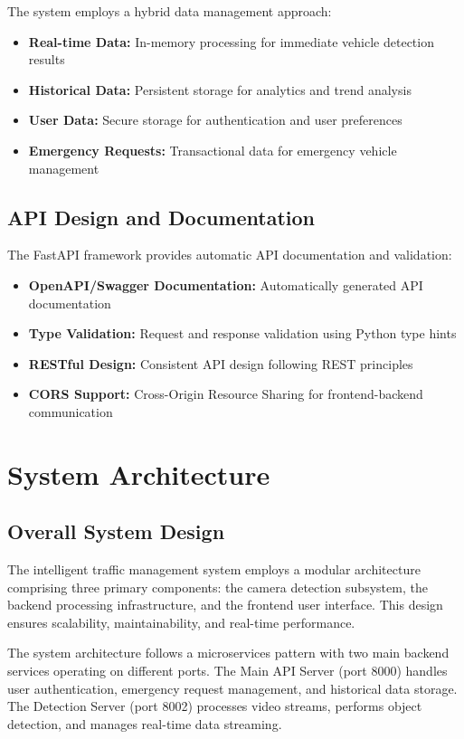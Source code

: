 \documentclass[conference]{IEEEtran}
\begin{document}
The system employs a hybrid data management approach:
\begin{itemize}
\item \textbf{Real-time Data:} In-memory processing for immediate vehicle detection results
\item \textbf{Historical Data:} Persistent storage for analytics and trend analysis
\item \textbf{User Data:} Secure storage for authentication and user preferences
\item \textbf{Emergency Requests:} Transactional data for emergency vehicle management
\end{itemize}

\subsection{API Design and Documentation}

The FastAPI framework provides automatic API documentation and validation:
\begin{itemize}
\item \textbf{OpenAPI/Swagger Documentation:} Automatically generated API documentation
\item \textbf{Type Validation:} Request and response validation using Python type hints
\item \textbf{RESTful Design:} Consistent API design following REST principles
\item \textbf{CORS Support:} Cross-Origin Resource Sharing for frontend-backend communication
\end{itemize}

\section{System Architecture}

\subsection{Overall System Design}

The intelligent traffic management system employs a modular architecture comprising three primary components: the camera detection subsystem, the backend processing infrastructure, and the frontend user interface. This design ensures scalability, maintainability, and real-time performance.

The system architecture follows a microservices pattern with two main backend services operating on different ports. The Main API Server (port 8000) handles user authentication, emergency request management, and historical data storage. The Detection Server (port 8002) processes video streams, performs object detection, and manages real-time data streaming.
\end{document}
